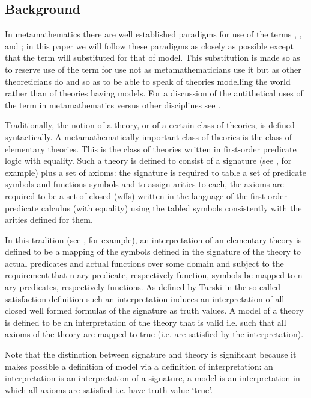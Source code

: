 \subsection{Background}
In metamathematics there are well established paradigms for use of the terms
, ,  and ;
in this paper  we will follow these paradigms as closely as possible except that the term  will substituted  for that of model. 
This substitution is made so as to reserve use of the term  for  use not as metamathematicians 
use it but as other theoreticians do and so as to be able to speak of theories modelling 
the world rather than of theories having models. For a discussion of the antithetical uses of the term 
 in metamathematics versus other disciplines see \cite{HodgesModelTheory}.

Traditionally, the notion of a theory, or of a certain class of theories, is  defined syntactically.
A metamathematically important class of theories  is the class of elementary theories. 
This is the class of theories written in first-order predicate logic with equality. 
Such a theory is defined to consist of a signature (see \cite{HodgesModelTheory}, for example) plus a set of axioms: 
the signature is required to table a set of predicate symbols and functions symbols and to assign arities to each, 
the axioms are required  to be a set of closed  (wffs) written
in the language of the first-order predicate calculus (with equality)
using the tabled  symbols  consistently with the arities defined for them. 

In this tradition (see \cite{Mendelson}, for example), an interpretation of an elementary theory is defined to be 
a mapping of the symbols defined in the signature  of the theory 
to actual predicates and actual functions over some domain 
and subject to the requirement that n-ary predicate, respectively function, symbols be mapped to n-ary predicates, respectively functions.
As defined by Tarski in the so called satisfaction definition
such an interpretation induces an interpretation of all
closed well formed formulas of the signature as truth values. 
A model of a theory is defined to be an interpretation of the theory that is valid i.e. such that all axioms of the theory are mapped to true (i.e. are satisfied by the interpretation). 

Note that the distinction between signature and theory is significant because it makes possible a definition of model 
via a definition of interpretation: an interpretation is an interpretation of a signature, 
a model is an interpretation in which all axioms are satisfied i.e. have truth value `true'.   

